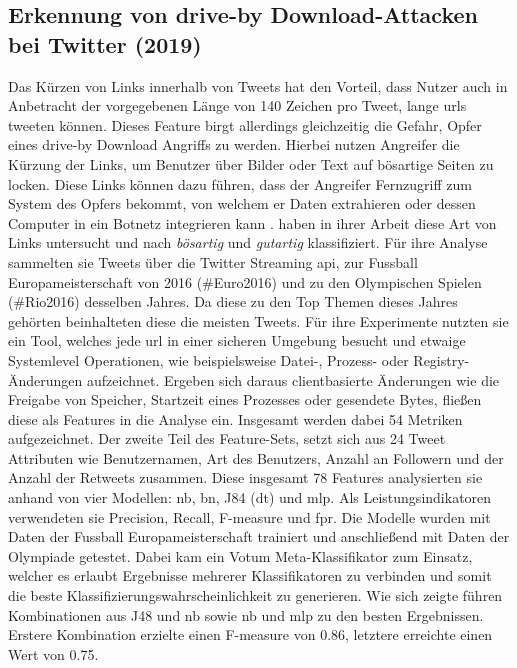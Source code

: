 \documentclass[
    12pt, %
    DIV10,
    ngerman, %
    a4paper, %
    oneside, %
    titlepage, %
    parskip=half, %
    headings=normal, %
    listof=totoc, %
    bibliography=totoc, %
    index=totoc, %
    captions=tableheading, %
    final %
]{scrreprt}
\begin{document}
\subsection{Erkennung von drive-by Download-Attacken bei Twitter (2019)}
Das Kürzen von Links innerhalb von Tweets hat den Vorteil, dass Nutzer auch in Anbetracht der vorgegebenen Länge von 140 Zeichen pro Tweet, lange \ac{urls} tweeten können. Dieses Feature birgt allerdings gleichzeitig die Gefahr, Opfer eines drive-by Download Angriffs zu werden. Hierbei nutzen Angreifer die Kürzung der Links, um Benutzer über Bilder oder Text auf bösartige Seiten zu locken. Diese Links können dazu führen, dass der Angreifer Fernzugriff zum System des Opfers bekommt, von welchem er Daten extrahieren oder dessen Computer in ein Botnetz integrieren kann \parencite{provos2007ghost}.
\textcite{Javed2019} haben in ihrer Arbeit diese Art von Links untersucht und nach \emph{bösartig} und \emph{gutartig} klassifiziert. Für ihre Analyse sammelten sie Tweets über die Twitter Streaming \ac{api}, zur Fussball Europameisterschaft von 2016 (\#Euro2016) und zu den Olympischen Spielen (\#Rio2016) desselben Jahres. Da diese zu den Top Themen dieses Jahres gehörten beinhalteten diese die meisten Tweets. Für ihre Experimente nutzten sie ein Tool, welches jede \ac{url} in einer sicheren Umgebung besucht und etwaige Systemlevel Operationen, wie beispielsweise Datei-, Prozess- oder Registry-Änderungen aufzeichnet. Ergeben sich daraus clientbasierte Änderungen wie die Freigabe von Speicher, Startzeit eines Prozesses oder gesendete Bytes, flie{\ss}en diese als Features in die Analyse ein. Insgesamt werden dabei 54 Metriken aufgezeichnet. Der zweite Teil des Feature-Sets, setzt sich aus 24 Tweet Attributen wie Benutzernamen, Art des Benutzers, Anzahl an Followern und der Anzahl der Retweets zusammen. Diese insgesamt 78 Features analysierten sie anhand von vier Modellen: \acl{nb}, \acl{bn}, J84 (\acl{dt}) und \ac{mlp}. Als Leistungsindikatoren verwendeten sie Precision, Recall, F-measure und \ac{fpr}. Die Modelle wurden mit Daten der Fussball Europameisterschaft trainiert und anschlie{\ss}end mit Daten der Olympiade getestet. Dabei kam ein Votum Meta-Klassifikator zum  Einsatz, welcher es erlaubt Ergebnisse mehrerer Klassifikatoren zu verbinden und somit die beste Klassifizierungswahrscheinlichkeit zu generieren. Wie sich zeigte führen Kombinationen aus J48 und \ac{nb} sowie \ac{nb} und \ac{mlp} zu den besten Ergebnissen. Erstere Kombination erzielte einen F-measure von 0.86, letztere erreichte einen Wert von 0.75.
\\\\
\end{document}
